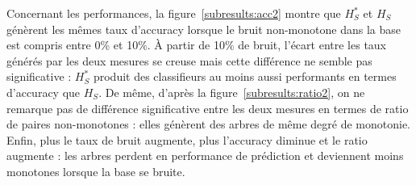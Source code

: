 \documentclass[a4paper]{article}
\newcommand{\figref}[1]{figure~\ref{#1}}
\begin{document}
Concernant les performances, la \figref{subresults:acc2} montre que $H^*_S$ et
$H_S$ génèrent les mêmes taux d'accuracy lorsque le bruit non-monotone dans la
base est compris entre 0\% et 10\%. À partir de 10\% de bruit, l'écart entre les
taux générés par les deux mesures se creuse mais cette différence ne semble pas
significative : $H^*_S$ produit des classifieurs au moins aussi performants en
termes d'accuracy que $H_S$. De même, d'après la \figref{subresults:ratio2}, on ne
remarque pas de différence significative entre les deux mesures en termes de
ratio de paires non-monotones : elles génèrent des arbres de même degré de
monotonie. Enfin, plus le taux de bruit augmente, plus l'accuracy diminue et le
ratio augmente : les arbres perdent en performance de prédiction et deviennent
moins monotones lorsque la base se bruite.
\end{document}
